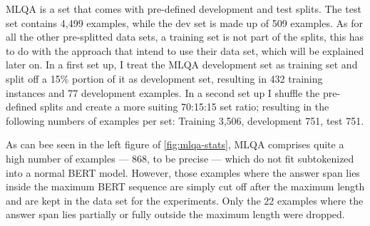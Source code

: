 



MLQA is a set that comes with pre-defined development and test splits. The test set
contains 4,499 examples, while the dev set is made up of 509 examples. As for all the
other pre-splitted data sets, a training set is not part of the splits, this has to do
with the approach that \cite{lewis2019mlqa} intend to use their data set, which will
be explained later on. In a first set up, I treat the MLQA development
set as training set and split off a 15\% portion of it as development set, resulting
in 432 training instances and 77 development examples. In a second set up I shuffle
the pre-defined splits and create a more suiting 70:15:15 set ratio; resulting in the
following numbers of examples per set: Training 3,506, development 751, test 751.

As can bee seen in the left figure of \ref{fig:mlqa-stats}, MLQA comprises quite a high number
of examples --- 868, to be precise --- which do not fit subtokenized into a normal BERT model.
However, those examples where the answer span lies inside the maximum BERT sequence are simply
cut off after the maximum length and are kept in the data set for the experiments. Only the 22
examples where the answer span lies partially or fully outside the maximum length were dropped.






